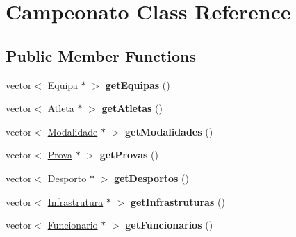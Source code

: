 \hypertarget{class_campeonato}{}\section{Campeonato Class Reference}
\label{class_campeonato}
\subsection*{Public Member Functions}
\begin{DoxyCompactItemize}
\item 
\hypertarget{class_campeonato_a719acf7e9d7053578ac0be5ce87c2ea2}{}vector$<$ \hyperlink{class_equipa}{Equipa} $\ast$ $>$ {\bfseries get\+Equipas} ()\label{class_campeonato_a719acf7e9d7053578ac0be5ce87c2ea2}

\item 
\hypertarget{class_campeonato_ad86008ec57adfadd03b0e6982a4f02d6}{}vector$<$ \hyperlink{class_atleta}{Atleta} $\ast$ $>$ {\bfseries get\+Atletas} ()\label{class_campeonato_ad86008ec57adfadd03b0e6982a4f02d6}

\item 
\hypertarget{class_campeonato_a5c4288c01e533e165bbfc965bd768640}{}vector$<$ \hyperlink{class_modalidade}{Modalidade} $\ast$ $>$ {\bfseries get\+Modalidades} ()\label{class_campeonato_a5c4288c01e533e165bbfc965bd768640}

\item 
\hypertarget{class_campeonato_a0f77135234349b6547980a1e33b3048b}{}vector$<$ \hyperlink{class_prova}{Prova} $\ast$ $>$ {\bfseries get\+Provas} ()\label{class_campeonato_a0f77135234349b6547980a1e33b3048b}

\item 
\hypertarget{class_campeonato_a8e8c964209b423f187758ba2cdd80f67}{}vector$<$ \hyperlink{class_desporto}{Desporto} $\ast$ $>$ {\bfseries get\+Desportos} ()\label{class_campeonato_a8e8c964209b423f187758ba2cdd80f67}

\item 
\hypertarget{class_campeonato_a195c40661d8b3795c99a9b6bb1d590e5}{}vector$<$ \hyperlink{class_infrastrutura}{Infrastrutura} $\ast$ $>$ {\bfseries get\+Infrastruturas} ()\label{class_campeonato_a195c40661d8b3795c99a9b6bb1d590e5}

\item 
\hypertarget{class_campeonato_ab97078647cdfe861697fa1f940fd15cc}{}vector$<$ \hyperlink{class_funcionario}{Funcionario} $\ast$ $>$ {\bfseries get\+Funcionarios} ()\label{class_campeonato_ab97078647cdfe861697fa1f940fd15cc}


\end{DoxyCompactItemize}
